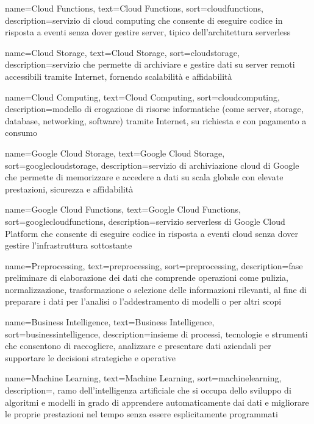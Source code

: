  {
    name=Cloud Functions,
    text=Cloud Functions,
    sort=cloudfunctions,
    description={servizio di cloud computing che consente di eseguire codice in risposta a eventi senza dover gestire server, tipico dell'architettura serverless}
}

 {
    name=Cloud Storage,
    text=Cloud Storage,
    sort=cloudstorage,
    description={servizio che permette di archiviare e gestire dati su server remoti accessibili tramite Internet, fornendo scalabilità e affidabilità}
}

 {
    name=Cloud Computing,
    text=Cloud Computing,
    sort=cloudcomputing,
    description={modello di erogazione di risorse informatiche (come server, storage, database, networking, software) tramite Internet, su richiesta e con pagamento a consumo}
}

 {
    name=Google Cloud Storage,
    text=Google Cloud Storage,
    sort=googlecloudstorage,
    description={servizio di archiviazione cloud di Google che permette di memorizzare e accedere a dati su scala globale con elevate prestazioni, sicurezza e affidabilità}
}

 {
    name=Google Cloud Functions,
    text=Google Cloud Functions,
    sort=googlecloudfunctions,
    description={servizio serverless di Google Cloud Platform che consente di eseguire codice in risposta a eventi cloud senza dover gestire l'infrastruttura sottostante}
}

 {
    name=Preprocessing,
    text=preprocessing,
    sort=preprocessing,
    description={fase preliminare di elaborazione dei dati che comprende operazioni come pulizia, normalizzazione, trasformazione o selezione delle informazioni rilevanti, al fine di preparare i dati per l'analisi o l'addestramento di modelli o per altri scopi}
}

 {
    name=Business Intelligence,
    text=Business Intelligence,
    sort=businessintelligence,
    description={insieme di processi, tecnologie e strumenti che consentono di raccogliere, analizzare e presentare dati aziendali per supportare le decisioni strategiche e operative}
}

 {
    name=Machine Learning,
    text=Machine Learning,
    sort=machinelearning,
    description={, ramo dell'intelligenza artificiale che si occupa dello sviluppo di algoritmi e modelli in grado di apprendere automaticamente dai dati e migliorare le proprie prestazioni nel tempo senza essere esplicitamente programmati}
}

